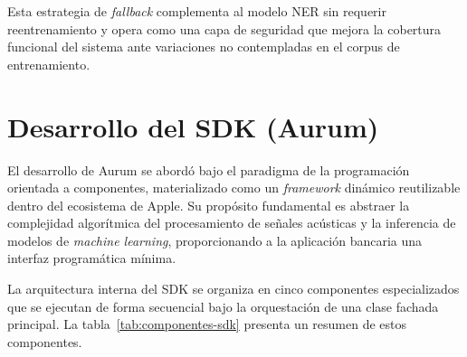 Esta estrategia de \textit{fallback} complementa al modelo NER sin requerir reentrenamiento y opera como una capa de seguridad que mejora la cobertura funcional del sistema ante variaciones no contempladas en el corpus de entrenamiento.

\section{Desarrollo del SDK (Aurum)}

El desarrollo de Aurum se abordó bajo el paradigma de la programación orientada a componentes, materializado como un \textit{framework} dinámico reutilizable dentro del ecosistema de Apple. Su propósito fundamental es abstraer la complejidad algorítmica del procesamiento de señales acústicas y la inferencia de modelos de \textit{machine learning}, proporcionando a la aplicación bancaria una interfaz programática mínima.

La arquitectura interna del SDK se organiza en cinco componentes especializados que se ejecutan de forma secuencial bajo la orquestación de una clase fachada principal. La tabla~\ref{tab:componentes-sdk} presenta un resumen de estos componentes.

\begin{table}[H]
\caption{Componentes del SDK Aurum y sus dependencias de frameworks nativos.}
\centering
{}
\label{tab:componentes-sdk}
\end{table}


